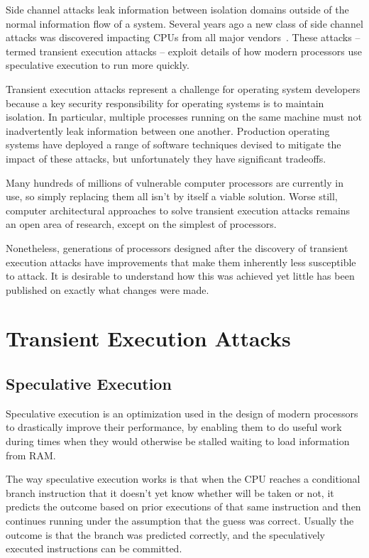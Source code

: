 \noindent
Side channel attacks leak information between isolation domains outside of the normal information flow of a system.
Several years ago a new class of side channel attacks was discovered impacting CPUs from all major vendors~\cite{lipp:meltdown, kocher:spectre}.
These attacks -- termed transient execution attacks -- exploit details of how modern processors use speculative execution to run more quickly. 

Transient execution attacks represent a challenge for operating system developers because a key security responsibility for operating systems is to maintain isolation.
In particular, multiple processes running on the same machine must not inadvertently leak information between one another.
Production operating systems have deployed a range of software techniques devised to mitigate the impact of these attacks, but unfortunately they have significant tradeoffs.

Many hundreds of millions of vulnerable computer processors are currently in use, so simply replacing them all isn’t by itself a viable solution.
Worse still, computer architectural approaches to solve transient execution attacks remains an open area of research, except on the simplest of processors.

Nonetheless, generations of processors designed after the discovery of transient execution attacks have improvements that make them inherently less susceptible to attack.
It is desirable to understand how this was achieved yet little has been published on exactly what changes were made.

\section{Transient Execution Attacks}
\subsection{Speculative Execution}
Speculative execution is an optimization used in the design of modern processors to drastically improve their performance, by enabling them to do useful work during times when they would otherwise be stalled waiting to load information from RAM.

The way speculative execution works is that when the CPU reaches a conditional branch instruction that it doesn't yet know whether will be taken or not, it predicts the outcome based on prior executions of that same instruction and then continues running under the assumption that the guess was correct.
Usually the outcome is that the branch was predicted correctly, and the speculatively executed instructions can be committed.

